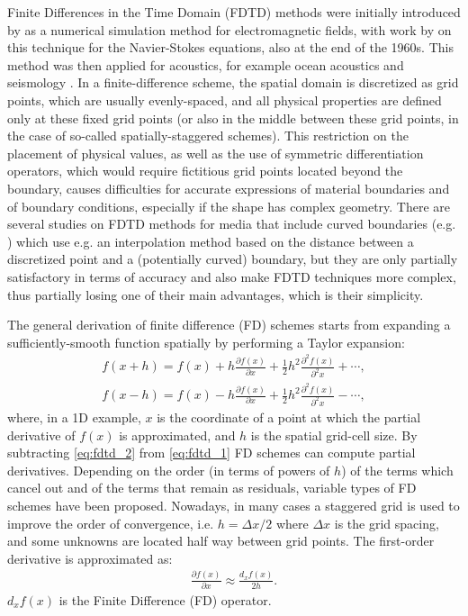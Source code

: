         Finite Differences in the Time Domain (FDTD) methods were initially introduced by \textcite{Yee1966Numericalsolutionof} as a numerical simulation method for electromagnetic fields,
with work by \cite{Cho68} on this technique for the Navier-Stokes equations, also at the end of the 1960s.
This method was then applied for acoustics, for example ocean acoustics and seismology \citep{Mad76,ViMa82,Vir84,Vir86,SaGoSh00,MiKo10}.
        In a finite-difference scheme, the spatial domain is discretized as grid points, which are usually evenly-spaced, and all physical properties are
defined only at these fixed grid points (or also in the middle between these grid points, in the case of so-called spatially-staggered schemes).
This restriction on the placement of physical values, as well as the use of symmetric differentiation operators,
which would require fictitious grid points located beyond the boundary, causes difficulties for accurate expressions of material boundaries and of boundary conditions,
especially if the shape has complex geometry. There are several studies on FDTD methods for media that include curved boundaries (e.g.
\textcite{Jurgens1992Finitedifferencetime,MoByKrCaBo97,KrMo03,Tarrass11}) which use e.g. an interpolation method based on the distance between a discretized point and a (potentially curved) boundary,
but they are only partially satisfactory in terms of accuracy and also make FDTD techniques more complex, thus partially losing one of their main advantages, which is their simplicity.

        The general derivation of finite difference (FD) schemes starts from expanding a sufficiently-smooth function spatially by performing a Taylor expansion:
        \begin{align} \label{eq:fdtd_1}
            f(x+h)=f(x)+h \frac{\partial f(x)}{\partial x}+\frac{1}{2}h^2 \frac{\partial^2 f(x)}{\partial^2 x}+\cdots,
        \end{align}
\vspace*{-4.5mm}
        \begin{align} \label{eq:fdtd_2}
            f(x-h)=f(x)-h \frac{\partial f(x)}{\partial x}+\frac{1}{2}h^2 \frac{\partial^2 f(x)}{\partial^2 x}-\cdots,
        \end{align}
        where, in a 1D example, $x$ is the coordinate of a point at which the partial derivative of $f(x)$ is approximated, and $h$ is the spatial grid-cell size.
By subtracting \ref{eq:fdtd_2} from \ref{eq:fdtd_1} FD schemes can compute partial derivatives.
Depending on the order (in terms of powers of $h$) of the terms which cancel out and of the terms that remain as residuals, variable types of FD schemes have been
proposed. Nowadays, in many cases a staggered grid is used to improve the order of convergence, i.e. $h=\Delta x/2$ where $\Delta x$ is the grid spacing, and some unknowns
are located half way between grid points.
        The first-order derivative is approximated as:
        \begin{align} \label{eq:fdtd_3}
            \frac{\partial f(x)}{\partial x}\approx \frac{d_xf(x)}{2h}.
        \end{align}
        $d_xf(x)$ is the Finite Difference (FD) operator.

